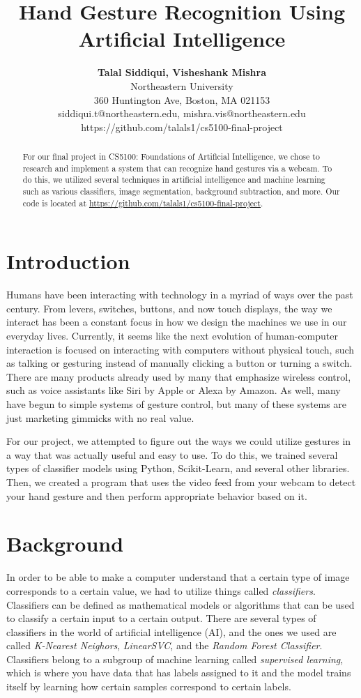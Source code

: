 \documentclass[letterpaper]{article} %
\title{Hand Gesture Recognition Using Artificial Intelligence}
\author{\Large \textbf{Talal Siddiqui, Visheshank Mishra}\\ %
Northeastern University\\
360 Huntington Ave, Boston, MA 021153\\
siddiqui.t@northeastern.edu, mishra.vis@northeastern.edu\\ %
https://github.com/talals1/cs5100-final-project
}
\begin{document}
\maketitle

\begin{abstract}
For our final project in CS5100: Foundations of Artificial Intelligence, we chose to research and implement a system that can recognize hand gestures via a webcam. To do this, we utilized several techniques in artificial intelligence and machine learning such as various classifiers, image segmentation, background subtraction, and more. Our code is located at \url{https://github.com/talals1/cs5100-final-project}.


\end{abstract}

\section{Introduction}
Humans have been interacting with technology in a myriad of ways over the past century. From levers, switches, buttons, and now touch displays, the way we interact has been a constant focus in how we design the machines we use in our everyday lives. Currently, it seems like the next evolution of human-computer interaction is focused on interacting with computers without physical touch, such as talking or gesturing instead of manually clicking a button or turning a switch. There are many products already used by many that emphasize wireless control, such as voice assistants like Siri by Apple or Alexa by Amazon. As well, many have begun to simple systems of gesture control, but many of these systems are just marketing gimmicks with no real value.

For our project, we attempted to figure out the ways we could utilize gestures in a way that was actually useful and easy to use. To do this, we trained several types of classifier models using Python, Scikit-Learn, and several other libraries. Then, we created a program that uses the video feed from your webcam to detect your hand gesture and then perform appropriate behavior based on it.

\section{Background}
In order to be able to make a computer understand that a certain type of image corresponds to a certain value, we had to utilize things called \textit{classifiers}. Classifiers can be defined as mathematical models or algorithms that can be used to classify a certain input to a certain output. There are several types of classifiers in the world of artificial intelligence (AI), and the ones we used are called \textit{K-Nearest Neighors}, \textit{LinearSVC}, and the \textit{Random Forest Classifier}. Classifiers belong to a subgroup of machine learning called \textit{supervised learning}, which is where you have data that has labels assigned to it and the model trains itself by learning how certain samples correspond to certain labels.
\end{document}
